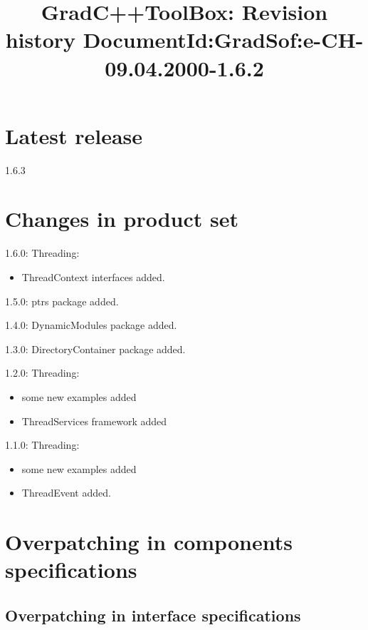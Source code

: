 \documentclass[10pt]{article}
\title{ GradC++ToolBox: Revision history \newline
        \small{DocumentId:GradSof:e-CH-09.04.2000-1.6.2}
      }
\begin{document}
\maketitle{}

\tableofcontents

\section{Latest release}

1.6.3

\section{Changes in product set}

\begin{description}
\item 1.6.0: Threading:
      \begin{itemize}
        \item ThreadContext interfaces added.
      \end{itemize}
\item 1.5.0: ptrs package added.
\item 1.4.0: DynamicModules package added.
\item 1.3.0: DirectoryContainer package added.
\item 1.2.0: Threading: 
      \begin{itemize}
      \item some new examples added
      \item ThreadServices framework added
      \end{itemize}
\item 1.1.0: Threading: 
      \begin{itemize}
      \item some new examples added
      \item ThreadEvent added.
      \end{itemize}
\end{description}

\section{Overpatching in components specifications}

\subsection{Overpatching in interface specifications}
\end{document}
